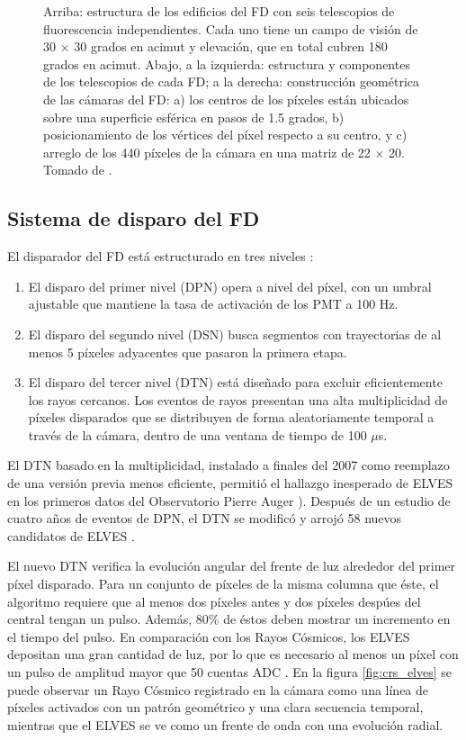 \documentclass[11pt,oneside,openany,letter]{book}
\begin{document}
\begin{figure}
    \caption[]{Arriba: estructura de los edificios del FD con seis telescopios de fluorescencia independientes. Cada uno tiene un campo de visión de 30 $\times$ 30 grados en acimut y elevación, que en total cubren 180 grados en acimut. Abajo, a la izquierda: estructura y componentes de los telescopios de cada FD; a la derecha: construcci\'on geom\'etrica de las c\'amaras del FD: a) los centros de los píxeles est\'an ubicados sobre una superficie esf\'erica en pasos de 1.5 grados, b) posicionamiento de los vértices del píxel respecto a su centro, y c) arreglo de los 440 píxeles de la c\'amara en una matriz de 22 $\times$ 20. Tomado de \cite{AbrahamEtal2010}.}
    \label{fig:fd_scheme}
\end{figure}

\subsection{Sistema de disparo del FD}
El disparador del FD está estructurado en tres niveles \cite{Mussa2019}: 
\begin{enumerate}
    \item El disparo del primer nivel (DPN) opera a nivel del píxel, con un umbral ajustable que mantiene la tasa de activación de los PMT a 100 Hz.
    \item El disparo del segundo nivel (DSN) busca segmentos con trayectorias de al menos 5 píxeles adyacentes que pasaron la primera etapa. 
    \item El disparo del tercer nivel (DTN) está diseñado para excluir eficientemente los rayos cercanos. Los eventos de rayos presentan una alta multiplicidad de píxeles disparados que se distribuyen de forma aleatoriamente temporal a través de la cámara, dentro de una ventana de tiempo de 100 $\mu$s. 
\end{enumerate}

El DTN basado en la multiplicidad, instalado a finales del 2007 como reemplazo de una versi\'on previa menos eficiente, permiti\'o el hallazgo inesperado de ELVES en los primeros datos del Observatorio Pierre Auger \cite{MussaCiaccio2012}). Después de un estudio de cuatro años de eventos de DPN, el DTN se modificó y arrojó 58 nuevos candidatos de ELVES \cite{Mussa2019}.

El nuevo DTN verifica la evoluci\'on angular del frente de luz alrededor del primer p\'ixel disparado. Para un conjunto de p\'ixeles de la misma columna que \'este, el algoritmo requiere que al menos dos p\'ixeles antes y dos p\'ixeles desp\'ues del central tengan un pulso. Adem\'as, 80\% de \'estos deben mostrar un incremento en el tiempo del pulso. En comparación con los Rayos Cósmicos, los ELVES depositan una gran cantidad de luz, por lo que es necesario al menos un píxel con un pulso de amplitud mayor que 50 cuentas ADC \cite{Mussa2019}. En la figura \ref{fig:crs_elves} se puede observar un Rayo C\'osmico registrado en la c\'amara como una l\'inea de p\'ixeles activados con un patr\'on geom\'etrico y una clara secuencia temporal, mientras que el ELVES se ve como un frente de onda con una evolución radial. 
\end{document}
